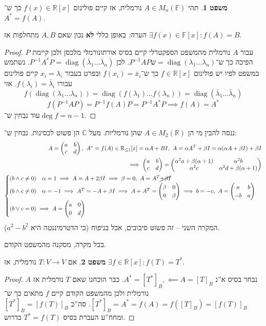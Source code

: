 \documentclass[a4paper]{article}
\newcommand\R     {\mathbb{R}}
\newcommand\C     {\mathbb{C}}
\DeclareMathOperator{\diag}    {diag}
\newcommand\F         {\mathbb{F}}
\newcommand\co        {\colon}
\newcommand\pms[1]    {\begin{pmatrix}
		#1
\end{pmatrix}}
\newcommand\ag        {\alpha}
\newcommand\bg        {\beta}
\renewcommand\lg      {\lambda}
\newcommand\op    {^{-1}}
\theoremstyle{definition}
\newtheorem{Theorem}{משפט}
\newcommand\theo  [1] {\begin{Theorem}#1\end{Theorem}}
\begin{document}
	\theo{תהי $A \in M_n(\F)$ נורמלית, אז קיים פולינום $f(x) \in \R[x]$ כך ש־$A^* = f(A)$. }
	\textit{הערה: }באופן כללי \textbf{לא} נכון שאם $A, B$ מתחלפות אז $\exists f(x) \in \F[x] \co f(A) = B$. 
	\begin{proof}
		עבור $A$ נורמלית מהמשפט הספקטרלי קיים בסיס אורתונורמלי מלכסן ולכן קיימת $P$ הפיכה כך ש־$P\op APש = \diag(\lg_1 \dots \lg_n)$. לכן $P\op A^* P = \diag(\bar \lg_1 \dots \bar \lg_n)$. נשתמש במשפט לפיו יש פולינום $f \in \R[x]$ כך ש־$f(x_i) = \bar x_i$ ובפרט בעבור $x_i = \lg_i$ קיים פולינום עבורו $f(\lg_i) = \bar \lg_i$. אזי 
		\[ f(\diag(\lg_1 \dots \lg_n)) = \diag(f(\lg_1) \dots f(\lg_n)) = \diag(\bar \lg_1 \dots \bar \lg_n) \]
		\[ f(P\op A P) = P\op f(A) P = P \op A^* P \implies f(A) = A^* \]
		עוד נבחין ש־$\deg f = n - 1$. 
	\end{proof}
	
	ננסה להבין מי הן $A \in M_2(\R)$ שהן נורמליות. מעל $\C$ הן פשוט לכסינות. נבחין ש־: 
	\begin{align*}
		A = \pms{a & b \\ c & d}, \ A^* = f(A) \in \R_{\le1}[x] = \ag A + BI, \ A = \ag A^T + \bg I = \ag(\ag A + \bg I) + \bg I \\ \implies \pms{a & b \\ c & d} = \pms{\ag^2 a + \bg(\ag + 1) & \ag^2 b \\ \ag^2 c & \ag^2 d + \bg (\ag + 1)} \\
		\begin{cases}
			(b \land c \neq 0 ) \quad \ag = 1 \implies  A = A + 2 \bg I \implies \bg = 0, \ A = A^T \cancel{+ \bg I} \\
			(b \land c \neq 0) \quad \ag = -1 \implies A^T = - A  +\bg I  \implies A + A^T = \pms{\bg & 0 \\ 0 & \bg} \implies b = -c, \ A = \pms{a & b \\ -b & a} \\
			(b \lor c = 0) \implies A = \pms{a & 0 \\ 0 & d}
		\end{cases}
	\end{align*}
	המקרה השני – זה פשוט סיבובים, אבל בניפוח (כי הדטרמיננטה היא $a^2 - b^2$). 
	
	בכל מקרה, מסקנה מהמשפט הקודם. 
	\theo{אם $T \co V \to V$ נורמלית, אז $\exists f \in \R[x] \co f(T) = T^*$. }
	\begin{proof}
		נבחר בסיס א''נ $A^* = [T^*]_B, \impliedby A = [T]_B$. כבר הוכחנו שאם $T$ נורמלית אז $A$ נורמלית ולכן מהמשפט הקודם קיים $f$ מתאים כך ש־$[T^*]_B = A^* = f(A) = f([T]_B) = [f(T)]_B$. סה''כ $[T^*]_B = [f(T)]_B$ ומחח''ע העברת בסיס $T^* = f(T)$ כדרוש. 
	\end{proof}
	
\end{document}
